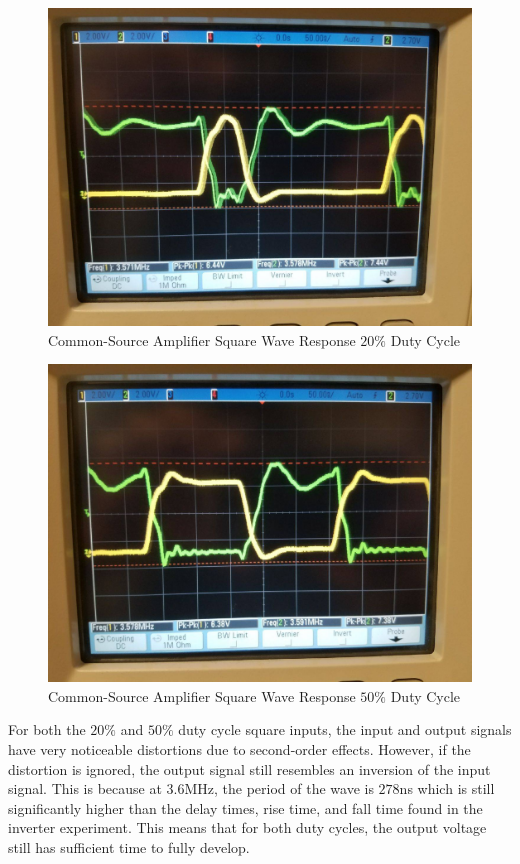 \FloatBarrier
\begin{figure}[h!]
	\centering
	\includegraphics[scale=0.25]{./images/amplifier_20.jpeg}
	\caption{Common-Source Amplifier Square Wave Response $20\%$ Duty Cycle}
	\label{fig:amplifier_20}
\end{figure}
\FloatBarrier

\FloatBarrier
\begin{figure}[h!]
	\centering
	\includegraphics[scale=0.25]{./images/amplifier_50.jpeg}
	\caption{Common-Source Amplifier Square Wave Response $50\%$ Duty Cycle}
	\label{fig:amplifier_50}
\end{figure}
\FloatBarrier

For both the $20\%$ and $50\%$ duty cycle square inputs, the input and output signals have very noticeable distortions due to second-order effects. However, if the distortion is ignored, the output signal still resembles an inversion of the input signal. This is because at 3.6\si{\mega\hertz}, the period of the wave is $278$\si{\nano\second} which is still significantly higher than the delay times, rise time, and fall time found in the inverter experiment. This means that for both duty cycles, the output voltage still has sufficient time to fully develop.
